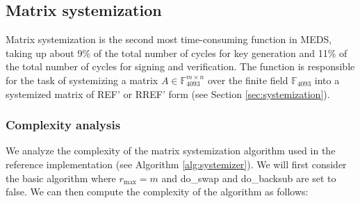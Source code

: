 \documentclass[11pt,a4paper]{report}
\theoremstyle{definition}
\begin{document}
\subsection{Matrix systemization}
\label{sec:matrixsystemization}
Matrix systemization is the second most time-consuming function in MEDS, taking up about 9\% of the total number of cycles for key generation and 11\% of the total number of cycles for signing and verification. The function is responsible for the task of systemizing a matrix $A \in \mathbb{F}_{4093}^{m \times n}$ over the finite field $\mathbb{F}_{4093}$ into a systemized matrix of REF' or RREF' form (see Section \ref{sec:systemization}).

\subsubsection{Complexity analysis}
\label{sec:matrixsystemizationcomplexity}
We analyze the complexity of the matrix systemization algorithm used in the reference implementation (see Algorithm \ref{alg:systemizer}). We will first consider the basic algorithm where $r_\text{max} = m$ and do\_swap and do\_backsub are set to false. We can then compute the complexity of the algorithm as follows:

\end{document}

